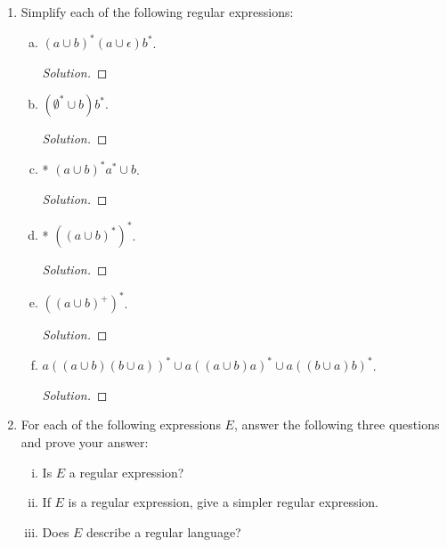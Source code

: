 \documentclass[10pt]{article}
\begin{document}
\begin{enumerate}[1)]
\item
Simplify each of the following regular expressions:
\begin{enumerate}[a)]
\item
$(a \cup b)^* (a \cup \epsilon) b^*$.
\begin{proof}[Solution]
\end{proof}
\item
$(\emptyset ^* \cup b) b^*$.
\begin{proof}[Solution]
\end{proof}
\item
* $(a \cup b)^*a^* \cup b$.
\begin{proof}[Solution]
\end{proof}
\item
* $((a \cup b)^*)^*$.
\begin{proof}[Solution]
\end{proof}

\pagebreak
\item
$((a \cup b)^+)^*$.
\begin{proof}[Solution]
\end{proof}
\item
$a ( (a \cup b)(b \cup a) )^* \cup a ( (a \cup b) a )^* \cup a ( (b \cup a) b )^*$.
\begin{proof}[Solution]
\end{proof}
\end{enumerate}
\item
For each of the following expressions $E$, answer the following three questions and prove your answer:
\begin{center}
\begin{enumerate}[(i)]
\item
Is $E$ a regular expression?

\item
If $E$ is a regular expression, give a simpler regular expression.

\item
Does $E$ describe a regular language?
\end{enumerate}
\end{center}


\end{enumerate}
\end{document}
